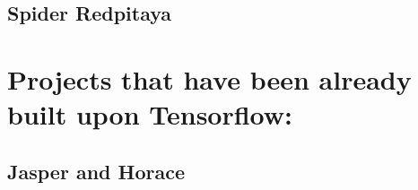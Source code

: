\subsection{Spider Redpitaya}

\section{Projects that have been already built upon Tensorflow:}

\subsection{Jasper and Horace }
